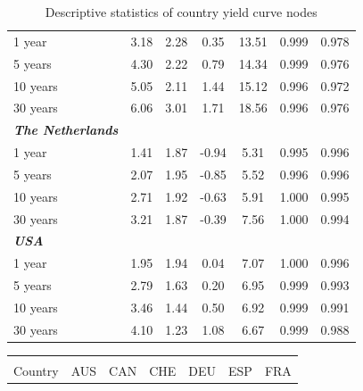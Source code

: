 \documentclass[12pt,bibliography=totoc]{article}
\begin{document}
\begin{appendices}
\begin{table}[H]
\begin{tabular}{l c c c c c c}
1 year	&	3.18	&	2.28	&	0.35	&	13.51	&	0.999	&	0.978	\\
5 years	&	4.30	&	2.22	&	0.79	&	14.34	&	0.999	&	0.976	\\
10 years	&	5.05	&	2.11	&	1.44	&	15.12	&	0.996	&	0.972	\\
30 years	&	6.06	&	3.01	&	1.71	&	18.56	&	0.996	&	0.976	\\
\textit{\textbf{The Netherlands}}	&		&		&		&		&		&		\\
1 year	&	1.41	&	1.87	&	-0.94	&	5.31	&	0.995	&	0.996	\\
5 years	&	2.07	&	1.95	&	-0.85	&	5.52	&	0.996	&	0.996	\\
10 years	&	2.71	&	1.92	&	-0.63	&	5.91	&	1.000	&	0.995	\\
30 years	&	3.21	&	1.87	&	-0.39	&	7.56	&	1.000	&	0.994	\\
\textit{\textbf{USA}}	&		&		&		&		&		&		\\
1 year	&	1.95	&	1.94	&	0.04	&	7.07	&	1.000	&	0.996	\\
5 years	&	2.79	&	1.63	&	0.20	&	6.95	&	0.999	&	0.993	\\
10 years	&	3.46	&	1.44	&	0.50	&	6.92	&	0.999	&	0.991	\\
30 years	&	4.10	&	1.23	&	1.08	&	6.67	&	0.999	&	0.988	\\



\hline%
\end{tabular}
\caption{Descriptive statistics of country yield curve nodes}%
\label{tab:curveDescripticeStatistics}
\end{table}

\begin{table}[H]

\fontsize{10}{10}\selectfont
\centering%
\captionsetup{justification=centering}

\begin{subtable}[t]{1\textwidth}
\centering%
\begin{tabular}{l cc cc cc cc cc cc}
\hline\hline \\ [-1.5ex]                         
 

Country	&	\multicolumn{2}{c}{AUS}			&	\multicolumn{2}{c}{CAN}			&	\multicolumn{2}{c}{CHE}			&	\multicolumn{2}{c}{DEU}			&	\multicolumn{2}{c}{ESP}			&	\multicolumn{2}{c}{FRA}			\\[0.5ex] 


\end{tabular}
\end{subtable}
\end{table}
\end{appendices}
\end{document}
